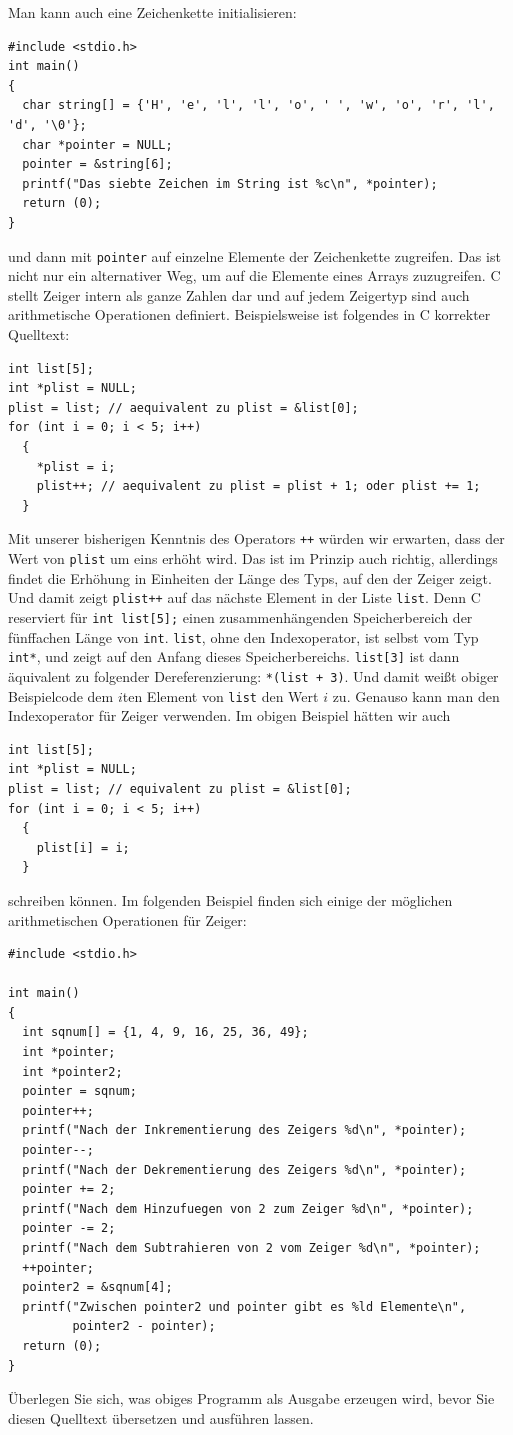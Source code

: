 Man kann auch eine Zeichenkette initialisieren:
\begin{lstlisting}
#include <stdio.h>
int main()
{
  char string[] = {'H', 'e', 'l', 'l', 'o', ' ', 'w', 'o', 'r', 'l', 'd', '\0'};
  char *pointer = NULL;
  pointer = &string[6];
  printf("Das siebte Zeichen im String ist %c\n", *pointer);
  return (0);
}
\end{lstlisting}
und dann mit \verb|pointer| auf einzelne Elemente der Zeichenkette zugreifen.
Das ist nicht nur ein alternativer Weg, um auf die Elemente eines Arrays zuzugreifen.
C stellt Zeiger intern als ganze Zahlen dar und auf jedem Zeigertyp sind auch arithmetische Operationen definiert.
Beispielsweise ist folgendes in C korrekter Quelltext:
\begin{lstlisting}
int list[5];
int *plist = NULL;
plist = list; // aequivalent zu plist = &list[0];
for (int i = 0; i < 5; i++)
  {
    *plist = i;
    plist++; // aequivalent zu plist = plist + 1; oder plist += 1;
  }
\end{lstlisting}
Mit unserer bisherigen Kenntnis des Operators \verb|++| würden wir erwarten, dass der Wert von \verb|plist| um eins erhöht wird.
Das ist im Prinzip auch richtig, allerdings findet die Erhöhung in Einheiten der Länge des Typs, auf den der Zeiger zeigt.
Und damit zeigt \verb|plist++| auf das nächste Element in der Liste \verb|list|.
Denn C reserviert für \verb|int list[5];| einen zusammenhängenden Speicherbereich der fünffachen Länge von \verb|int|.
\verb|list|, ohne den Indexoperator, ist selbst vom Typ \verb|int*|, und zeigt auf den Anfang dieses Speicherbereichs.
\verb|list[3]| ist dann äquivalent zu folgender Dereferenzierung: \verb|*(list + 3)|.
Und damit weißt obiger Beispielcode dem $i$ten Element von \verb|list| den Wert $i$ zu.
Genauso kann man den Indexoperator für Zeiger verwenden.
Im obigen Beispiel hätten wir auch
\begin{lstlisting}
int list[5];
int *plist = NULL;
plist = list; // equivalent zu plist = &list[0];
for (int i = 0; i < 5; i++)
  {
    plist[i] = i;
  }
\end{lstlisting}
schreiben können.
Im folgenden Beispiel finden sich einige der möglichen arithmetischen Operationen für Zeiger:
\begin{lstlisting}
#include <stdio.h>

int main()
{
  int sqnum[] = {1, 4, 9, 16, 25, 36, 49};
  int *pointer;
  int *pointer2;
  pointer = sqnum;
  pointer++;
  printf("Nach der Inkrementierung des Zeigers %d\n", *pointer);
  pointer--;
  printf("Nach der Dekrementierung des Zeigers %d\n", *pointer);
  pointer += 2;
  printf("Nach dem Hinzufuegen von 2 zum Zeiger %d\n", *pointer);
  pointer -= 2;
  printf("Nach dem Subtrahieren von 2 vom Zeiger %d\n", *pointer);
  ++pointer;
  pointer2 = &sqnum[4];
  printf("Zwischen pointer2 und pointer gibt es %ld Elemente\n",
         pointer2 - pointer);
  return (0);
}
\end{lstlisting}
Überlegen Sie sich, was obiges Programm als Ausgabe erzeugen wird, bevor Sie diesen Quelltext übersetzen und ausführen lassen.

